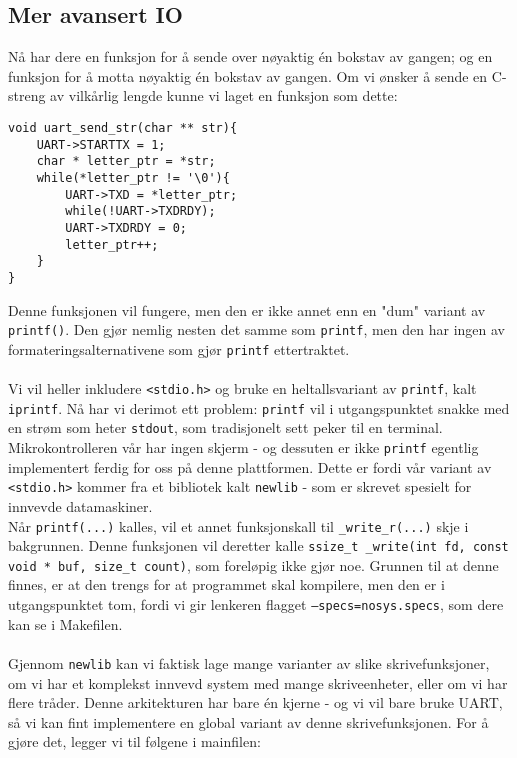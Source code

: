 \documentclass[11pt,a4paper]{article}
\begin{document}
\subsection{Mer avansert IO}
Nå har dere en funksjon for å sende over nøyaktig én bokstav av gangen; og en funksjon for å motta nøyaktig én bokstav av gangen. Om vi ønsker å sende en C-streng av vilkårlig lengde kunne vi laget en funksjon som dette:
\begin{verbatim}
void uart_send_str(char ** str){
	UART->STARTTX = 1;
	char * letter_ptr = *str;
	while(*letter_ptr != '\0'){
		UART->TXD = *letter_ptr;
		while(!UART->TXDRDY);
		UART->TXDRDY = 0;
		letter_ptr++;
	}
}
\end{verbatim}
Denne funksjonen vil fungere, men den er ikke annet enn en "dum" variant av \texttt{printf()}. Den gjør nemlig nesten det samme som \texttt{printf}, men den har ingen av formateringsalternativene som gjør \texttt{printf} ettertraktet.\\
\\
Vi vil heller inkludere \texttt{<stdio.h>} og bruke en heltallsvariant av \texttt{printf}, kalt \texttt{iprintf}. Nå har vi derimot ett problem: \texttt{printf} vil i utgangspunktet snakke med en strøm som heter \texttt{stdout}, som tradisjonelt sett peker til en terminal.\\
Mikrokontrolleren vår har ingen skjerm - og dessuten er ikke \texttt{printf} egentlig implementert ferdig for oss på denne plattformen. Dette er fordi vår variant av \texttt{<stdio.h>} kommer fra et bibliotek kalt \texttt{newlib} - som er skrevet spesielt for innvevde datamaskiner.\\
Når \texttt{printf(...)} kalles, vil et annet funksjonskall til \texttt{_write_r(...)} skje i bakgrunnen. Denne funksjonen vil deretter kalle \texttt{ssize_t _write(int fd, const void * buf, size_t count)}, som foreløpig ikke gjør noe. Grunnen til at denne finnes, er at den trengs for at programmet skal kompilere, men den er i utgangspunktet tom, fordi vi gir lenkeren flagget \texttt{--specs=nosys.specs}, som dere kan se i Makefilen.\\
\\
Gjennom \texttt{newlib} kan vi faktisk lage mange varianter av slike skrivefunksjoner, om vi har et komplekst innvevd system med mange skriveenheter, eller om vi har flere tråder. Denne arkitekturen har bare én kjerne - og vi vil bare bruke UART, så vi kan fint implementere en global variant av denne skrivefunksjonen. For å gjøre det, legger vi til følgene i mainfilen:
\end{document}
